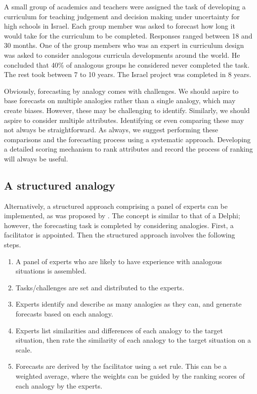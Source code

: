 \documentclass[]{book}
\providecommand{\tightlist}{%
  \setlength{\itemsep}{0pt}\setlength{\parskip}{0pt}}
\begin{document}
A small group of academics and teachers were assigned the task of developing a curriculum for teaching judgement and decision making under uncertainty for high schools in Israel. Each group member was asked to forecast how long it would take for the curriculum to be completed. Responses ranged between 18 and 30 months. One of the group members who was an expert in curriculum design was asked to consider analogous curricula developments around the world. He concluded that 40\% of analogous groups he considered never completed the task. The rest took between 7 to 10 years. The Israel project was completed in 8 years.

Obviously, forecasting by analogy comes with challenges. We should aspire to base forecasts on multiple analogies rather than a single analogy, which may create biases. However, these may be challenging to identify. Similarly, we should aspire to consider multiple attributes. Identifying or even comparing these may not always be straightforward. As always, we suggest performing these comparisons and the forecasting process using a systematic approach. Developing a detailed scoring mechanism to rank attributes and record the process of ranking will always be useful.

\hypertarget{a-structured-analogy}{%
\subsection*{A structured analogy}\label{a-structured-analogy}}

Alternatively, a structured approach comprising a panel of experts can be implemented, as was proposed by \citet{Green2007}. The concept is similar to that of a Delphi; however, the forecasting task is completed by considering analogies. First, a facilitator is appointed. Then the structured approach involves the following steps.

\begin{enumerate}
\def\labelenumi{\arabic{enumi}.}
\tightlist
\item
  A panel of experts who are likely to have experience with analogous situations is assembled.
\item
  Tasks/challenges are set and distributed to the experts.
\item
  Experts identify and describe as many analogies as they can, and generate forecasts based on each analogy.
\item
  Experts list similarities and differences of each analogy to the target situation, then rate the similarity of each analogy to the target situation on a scale.
\item
  Forecasts are derived by the facilitator using a set rule. This can be a weighted average, where the weights can be guided by the ranking scores of each analogy by the experts.
\end{enumerate}
\end{document}
